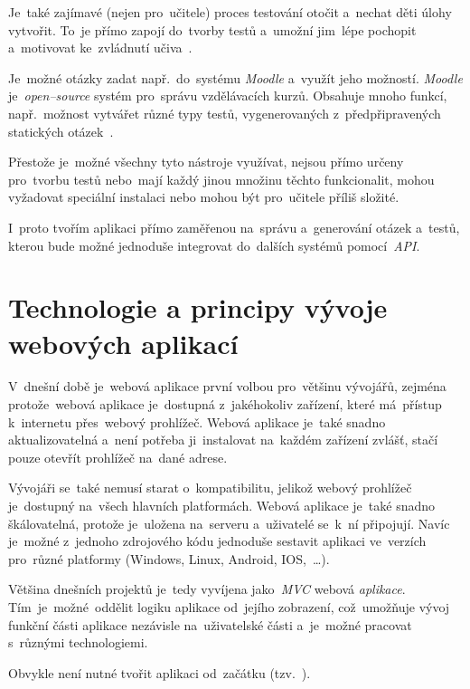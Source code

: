 \documentclass[11pt,a4paper]{report}
\let\oldacrshort\acrshort
\renewcommand{\acrshort}[1]{\emph{\normalsize\color[rgb]{0,0,0}\noindent\oldacrshort{#1}}}
\begin{document}
            Je~také zajímavé (nejen pro~učitele) proces testování otočit a~nechat děti úlohy vytvořit. To~je přímo zapojí do~tvorby testů a~umožní jim~lépe pochopit a~motivovat ke~zvládnutí učiva~\cite{hedlovam:chybavresenim}.

            Je~možné otázky zadat např.~do~systému \emph{Moodle} a~využít jeho možností. \emph{Moodle} je~\emph{open--source} systém pro~správu vzdělávacích kurzů. Obsahuje mnoho funkcí, např.~možnost vytvářet různé typy testů, vygenerovaných z~předpřipravených statických otázek~\cite{drlik2013moodle}.

            Přestože je~možné všechny tyto nástroje využívat, nejsou přímo určeny pro~tvorbu testů nebo~mají každý jinou množinu těchto funkcionalit, mohou vyžadovat speciální instalaci nebo mohou být pro~učitele příliš složité.
            
            I~proto tvořím aplikaci přímo zaměřenou na~správu a~generování otázek a~testů, kterou bude možné jednoduše integrovat do~dalších systémů pomocí~\acrshort{API}.

    \chapter{Technologie a principy vývoje webových aplikací}
        V~dnešní době je~webová aplikace první volbou pro~většinu vývojářů, zejména protože~webová aplikace je~dostupná z~jakéhokoliv zařízení, které má~přístup k~internetu přes~webový prohlížeč. Webová aplikace je~také snadno aktualizovatelná a~není potřeba ji~instalovat na~každém zařízení zvlášť, stačí pouze otevřít prohlížeč na~dané adrese.
        
        Vývojáři se~také nemusí starat o~kompatibilitu, jelikož webový prohlížeč je~dostupný na~všech hlavních platformách. Webová aplikace je~také snadno škálovatelná, protože je~uložena na~serveru a~uživatelé se~k~ní připojují. Navíc je~možné z~jednoho zdrojového kódu jednoduše sestavit aplikaci ve~verzích pro~různé platformy (Windows, Linux, Android, IOS,~\dots).~\cite{adobe:webapp}

        Většina dnešních projektů je~tedy vyvíjena jako~\emph{MVC} webová \emph{aplikace}. Tím~je~možné~oddělit logiku aplikace od~jejího zobrazení, což~umožňuje vývoj funkční části aplikace nezávisle na~uživatelské části a~je~možné pracovat s~různými technologiemi.
        
        Obvykle není nutné tvořit aplikaci od~začátku (tzv.~). ~\cite{itnetworkBestPractices}
\end{document}
